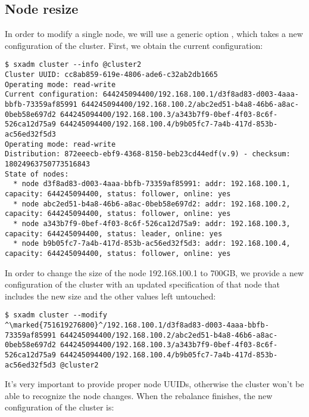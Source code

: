 \subsection{Node resize}
In order to modify a single node, we will use a generic option
, which takes a new configuration of the cluster.
First, we obtain the current configuration:
\begin{lstlisting}
$ sxadm cluster --info @cluster2
Cluster UUID: cc8ab859-619e-4806-ade6-c32ab2db1665
Operating mode: read-write
Current configuration: 644245094400/192.168.100.1/d3f8ad83-d003-4aaa-bbfb-73359af85991 644245094400/192.168.100.2/abc2ed51-b4a8-46b6-a8ac-0beb58e697d2 644245094400/192.168.100.3/a343b7f9-0bef-4f03-8c6f-526ca12d75a9 644245094400/192.168.100.4/b9b05fc7-7a4b-417d-853b-ac56ed32f5d3 
Operating mode: read-write
Distribution: 872eeecb-ebf9-4368-8150-beb23cd44edf(v.9) - checksum: 18024963750773516843
State of nodes:
  * node d3f8ad83-d003-4aaa-bbfb-73359af85991: addr: 192.168.100.1, capacity: 644245094400, status: follower, online: yes
  * node abc2ed51-b4a8-46b6-a8ac-0beb58e697d2: addr: 192.168.100.2, capacity: 644245094400, status: follower, online: yes
  * node a343b7f9-0bef-4f03-8c6f-526ca12d75a9: addr: 192.168.100.3, capacity: 644245094400, status: leader, online: yes
  * node b9b05fc7-7a4b-417d-853b-ac56ed32f5d3: addr: 192.168.100.4, capacity: 644245094400, status: follower, online: yes
\end{lstlisting}
In order to change the size of the node 192.168.100.1 to 700GB, we
provide a new configuration of the cluster with an updated specification of
that node that includes the new size and the other values left untouched:
\begin{lstlisting}
$ sxadm cluster --modify ^\marked{751619276800}^/192.168.100.1/d3f8ad83-d003-4aaa-bbfb-73359af85991 644245094400/192.168.100.2/abc2ed51-b4a8-46b6-a8ac-0beb58e697d2 644245094400/192.168.100.3/a343b7f9-0bef-4f03-8c6f-526ca12d75a9 644245094400/192.168.100.4/b9b05fc7-7a4b-417d-853b-ac56ed32f5d3 @cluster2
\end{lstlisting}
It's very important to provide proper node UUIDs, otherwise the cluster won't
be able to recognize the node changes. When the rebalance finishes, the new
configuration of the cluster is:
